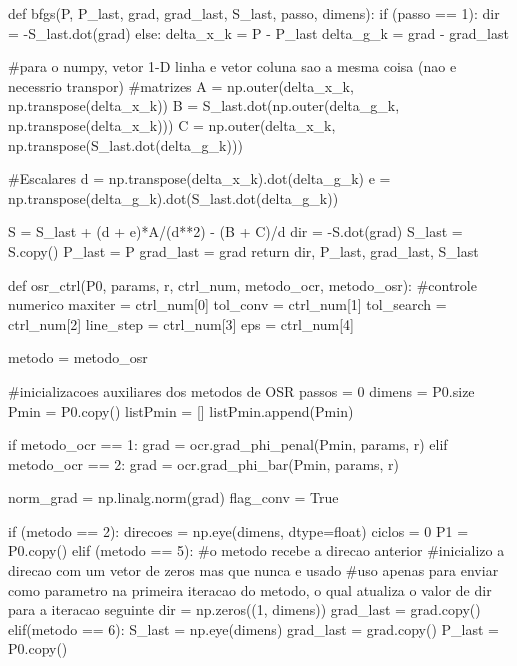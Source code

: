 \documentclass[10pt, a4paper]{article}
\begin{document}
\begin{python}
  def bfgs(P, P_last, grad, grad_last, S_last, passo, dimens):
      if (passo == 1):
          dir = -S_last.dot(grad)
      else:
          delta_x_k = P - P_last
          delta_g_k = grad - grad_last
          
          #para o numpy, vetor 1-D linha e vetor coluna sao a mesma coisa (nao e necessrio transpor)
          #matrizes
          A = np.outer(delta_x_k, np.transpose(delta_x_k))
          B = S_last.dot(np.outer(delta_g_k, np.transpose(delta_x_k)))
          C = np.outer(delta_x_k, np.transpose(S_last.dot(delta_g_k)))
          
          #Escalares        
          d = np.transpose(delta_x_k).dot(delta_g_k)
          e = np.transpose(delta_g_k).dot(S_last.dot(delta_g_k))
                  
          S = S_last + (d + e)*A/(d**2) - (B + C)/d
          dir = -S.dot(grad)
          S_last = S.copy()
      P_last = P
      grad_last = grad
      return dir, P_last, grad_last, S_last

  def osr_ctrl(P0, params, r, ctrl_num, metodo_ocr, metodo_osr):
      #controle numerico
      maxiter = ctrl_num[0]
      tol_conv = ctrl_num[1]
      tol_search = ctrl_num[2]
      line_step = ctrl_num[3]
      eps = ctrl_num[4]
      
      metodo = metodo_osr
          
      #inicializacoes auxiliares dos metodos de OSR
      passos = 0
      dimens = P0.size
      Pmin = P0.copy()
      listPmin = []
      listPmin.append(Pmin)
      
      if metodo_ocr == 1:
          grad = ocr.grad_phi_penal(Pmin, params, r)
      elif metodo_ocr == 2:
          grad = ocr.grad_phi_bar(Pmin, params, r)
      
      norm_grad = np.linalg.norm(grad)
      flag_conv = True

      if (metodo == 2):
          direcoes = np.eye(dimens, dtype=float)
          ciclos = 0
          P1 = P0.copy()
      elif (metodo == 5):
          #o metodo recebe a direcao anterior 
          #inicializo a direcao com um vetor de zeros mas que nunca e usado
          #uso apenas para enviar como parametro na primeira iteracao do metodo, o qual atualiza o valor de dir para a iteracao seguinte
          dir = np.zeros((1, dimens))
          grad_last = grad.copy()
      elif(metodo == 6):
          S_last = np.eye(dimens)
          grad_last = grad.copy()
          P_last = P0.copy()
      

\end{python}
\end{document}
